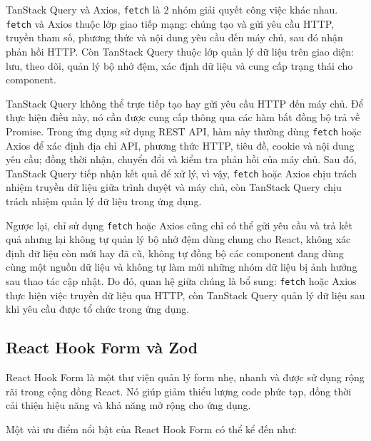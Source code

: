 TanStack Query và Axios, \texttt{fetch} là 2 nhóm giải quyết công việc khác nhau. \texttt{fetch} và Axios thuộc lớp giao tiếp mạng: chúng tạo và gửi yêu cầu HTTP, truyền tham số, phương thức và nội dung yêu cầu đến máy chủ, sau đó nhận phản hồi HTTP. Còn TanStack Query thuộc lớp quản lý dữ liệu trên giao diện: lưu, theo dõi, quản lý bộ nhớ đệm, xác định dữ liệu và cung cấp trạng thái cho component.

TanStack Query không thể trực tiếp tạo hay gửi yêu cầu HTTP đến máy chủ. Để thực hiện điều này, nó cần được cung cấp thông qua các hàm bất đồng bộ trả về Promise. Trong ứng dụng sử dụng REST API, hàm này thường dùng \texttt{fetch} hoặc Axios để xác định địa chỉ API, phương thức HTTP, tiêu đề, cookie và nội dung yêu cầu; đồng thời nhận, chuyển đổi và kiểm tra phản hồi của máy chủ. Sau đó, TanStack Query tiếp nhận kết quả để xử lý, vì vậy, \texttt{fetch} hoặc Axios chịu trách nhiệm truyền dữ liệu giữa trình duyệt và máy chủ, còn TanStack Query chịu trách nhiệm quản lý dữ liệu trong ứng dụng.

Ngược lại, chỉ sử dụng \texttt{fetch} hoặc Axios cũng chỉ có thể gửi yêu cầu và trả kết quả nhưng lại không tự quản lý bộ nhớ đệm dùng chung cho React, không xác định dữ liệu còn mới hay đã cũ, không tự đồng bộ các component đang dùng cùng một nguồn dữ liệu và không tự làm mới những nhóm dữ liệu bị ảnh hưởng sau thao tác cập nhật. Do đó, quan hệ giữa chúng là bổ sung: \texttt{fetch} hoặc Axios thực hiện việc truyền dữ liệu qua HTTP, còn TanStack Query quản lý dữ liệu sau khi yêu cầu được tổ chức trong ứng dụng.

\subsection{React Hook Form và Zod}

React Hook Form là một thư viện quản lý form nhẹ, nhanh và được sử dụng rộng rãi trong cộng đồng React. Nó giúp giảm thiểu lượng code phức tạp, đồng thời cải thiện hiệu năng và khả năng mở rộng cho ứng dụng. 

Một vài ưu điểm nổi bật của React Hook Form có thể kể đến như:

